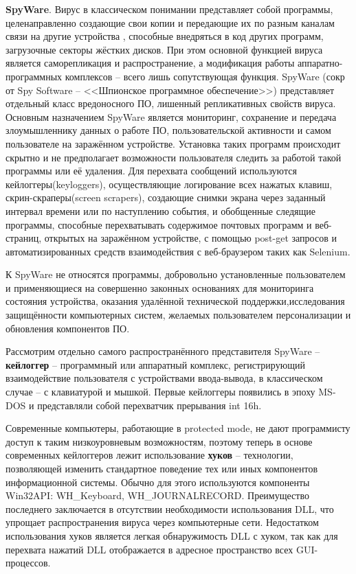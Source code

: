 	\textbf{SpyWare}. Вирус в классическом понимании представляет собой программы, целенаправленно создающие свои копии и передающие их по разным каналам связи на другие устройства , способные внедряться в код других программ, загрузочные секторы жёстких дисков. При этом основной функцией вируса является саморепликация и распространение, а модификация  работы аппаратно-программных комплексов -- всего лишь сопутствующая функция. SpyWare (сокр от Spy Software -- <<Шпионское программное обеспечение>>) представляет отдельный класс вредоносного ПО, лишенный репликативных свойств вируса. Основным назначением SpyWare является мониторинг, сохранение и передача злоумышленнику данных о работе ПО, пользовательской активности и самом пользователе  на заражённом устройстве. Установка таких программ происходит скрытно и не предполагает возможности пользователя следить за работой такой программы или её удаления.     Для перехвата сообщений используются кейлоггеры(keyloggers), осуществляющие логирование всех нажатых клавиш, скрин-скраперы(screen scrapers), создающие снимки экрана через заданный интервал времени или по наступлению события, и обобщенные следящие программы, способные перехватывать содержимое почтовых программ и веб-страниц, открытых на заражённом устройстве, с помощью post-get запросов и автоматизированных средств взаимодействия с веб-браузером таких как Selenium. 
	
	
	К SpyWare не относятся программы, добровольно установленные пользователем и применяющиеся на совершенно  законных основаниях  для мониторинга состояния устройства, оказания удалённой технической поддержки,исследования защищённости компьютерных систем, желаемых пользователем персонализации и обновления компонентов ПО. %
	
	Рассмотрим отдельно самого распространённого представителя SpyWare -- \textbf{кейлоггер} -- программный или аппаратный комплекс, регистрирующий взаимодействие пользователя с устройствами ввода-вывода, в классическом случае -- с клавиатурой и мышкой. %
	Первые кейлоггеры появились в эпоху MS-DOS и представляли собой перехватчик прерывания int  16h.	 %
	
	
	Современные компьютеры, работающие в protected mode, не дают программисту доступ к таким низкоуровневым возможностям, поэтому теперь в основе современных кейлоггеров лежит использование \textbf{хуков} -- технологии, позволяющей изменить стандартное поведение тех или иных компонентов информационной системы. Обычно для этого используются компоненты Win32API: WH\_Keyboard, WH\_JOURNALRECORD. Преимущество последнего заключается в отсутствии необходимости использования DLL, что упрощает распространения вируса через компьютерные сети. Недостатком использования хуков является легкая обнаружимость DLL с хуком, так как для перехвата нажатий DLL отображается в адресное пространство всех GUI-процессов. 
	
